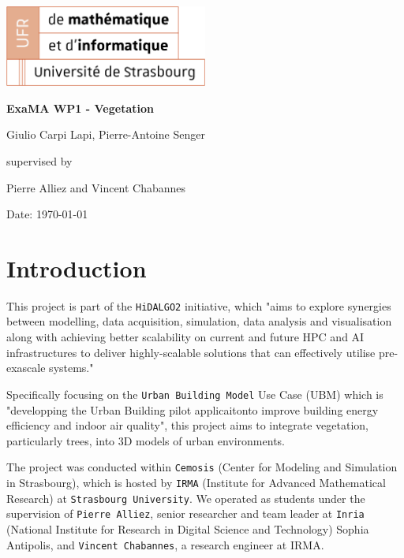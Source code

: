 \documentclass[12pt]{article}
\begin{document}
\begin{titlepage}
\centering
\includegraphics[width=0.5\textwidth]{images/logo_ufr.png}\par\vspace{1cm}
\vspace{1.5cm}
{\huge\bfseries ExaMA WP1 - Vegetation\par}
\vspace{2cm}
{\Large Giulio Carpi Lapi, Pierre-Antoine Senger\par}
\vfill
supervised by\par
Pierre Alliez and Vincent Chabannes

\vfill

{\large Date: \today\par}
\end{titlepage}

\tableofcontents

\newpage

\section{Introduction}

This project is part of the \texttt{HiDALGO2}\cite{hidalgo2} initiative, which
"aims to explore synergies between modelling, data acquisition, simulation,
data analysis and visualisation along with achieving better scalability on
current and future HPC and AI infrastructures to deliver highly-scalable
solutions that can effectively utilise pre-exascale systems."\cite{hidalgo2-about}

Specifically focusing on the \texttt{Urban Building Model}\cite{hidalgo2-ubm}
Use Case (UBM) which is "developping the Urban Building pilot applicaitonto
improve building energy efficiency and indoor air quality"\cite{hidalgo2-ubm},
this project aims to integrate vegetation, particularly trees, into 3D models
of urban environments.

The project was conducted within \texttt{Cemosis}\cite{cemosis} (Center for
Modeling and Simulation in Strasbourg), which is hosted by
\texttt{IRMA}\cite{irma} (Institute for Advanced Mathematical Research) at
\texttt{Strasbourg University}. We operated as students under the supervision of
\texttt{Pierre Alliez}\cite{alliez}, senior researcher and team leader at
\texttt{Inria}\cite{Inria} (National Institute for Research in Digital Science
and Technology) Sophia Antipolis, and \texttt{Vincent Chabannes}\cite{chabannes},
a research engineer at IRMA.
\end{document}
